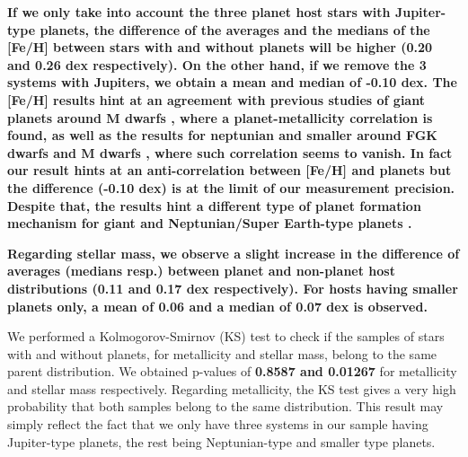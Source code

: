 \documentclass[structabstract]{aa}
\begin{document}
\textbf{If we only take into account the three planet host stars with Jupiter-type planets, the difference of the averages and the medians of the [Fe/H] between stars with and without planets will be higher (0.20 and 0.26 dex respectively). On the other hand, if we remove the 3 systems with Jupiters, we obtain a mean and median of -0.10 dex. \textbf{The [Fe/H] results hint at an agreement with previous studies of giant planets around M dwarfs \citep[e.g.][]{Bonfils-2007,Johnson-2009,Johnson-2010,Schlaufman-2010,Rojas-Ayala-2010,Rojas-Ayala-2012,Terrien-2012}, where a planet-metallicity correlation is found, as well as the results for neptunian and smaller around FGK dwarfs \citep[e.g.][]{Sousa-2008,Bouchy-2009,Sousa-2011b, Mayor-2011} and M dwarfs \citep[e.g.][]{Rojas-Ayala-2012,Terrien-2012}}, where such correlation seems to vanish. In fact our result hints at an anti-correlation between [Fe/H] and planets but the difference (-0.10 dex) is at the limit of our measurement precision. Despite that, the results hint a different type of planet formation \textbf{mechanism} for giant and Neptunian/Super Earth-type planets \citep[e.g.][more?]{Mordasini-2012}.}

\textbf{Regarding stellar mass, we observe a slight increase in the difference of averages (medians resp.) between planet and non-planet host distributions (0.11 and 0.17 dex respectively). For hosts having smaller planets only, a mean of 0.06 and a median of 0.07 dex is observed.}


We performed a Kolmogorov-Smirnov (KS) test to check if the samples of stars with and without planets, for metallicity and stellar mass, belong to the same parent distribution. We obtained p-values of \textbf{0.8587 and 0.01267} for metallicity and stellar mass respectively.  Regarding metallicity, the KS test gives a very high probability that both samples belong to the same distribution. This result may simply reflect the fact that we only have three systems in our sample having Jupiter-type planets, the rest being Neptunian-type and smaller type planets.




\end{document}
